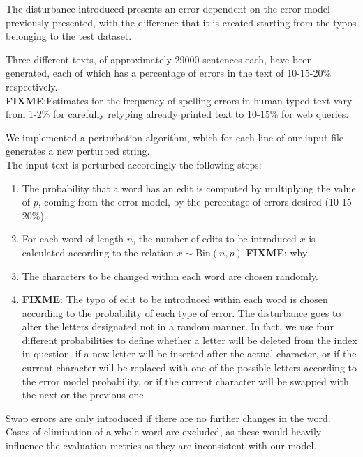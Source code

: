 The disturbance introduced presents an error dependent on the error model previously presented, with the 
difference that it is created starting from the typos belonging to the test dataset.

Three different texts, of approximately \num{29000} sentences each, have been generated, each of which has a 
percentage of errors in the text of \num{10}-\num{15}-\num{20}\% respectively. \\

\textbf{FIXME}:Estimates for the frequency of spelling errors in human-typed text vary from 1-2\% for carefully retyping 
already printed 
text to 10-15\% for web queries.

We implemented a perturbation algorithm, which for each line of our input file generates a new perturbed string.\\
The input text is perturbed accordingly the following steps:

\begin{enumerate}
	\item The probability that a word has an edit is computed by multiplying the value of $p$, coming from the error model, 
	by the percentage of errors desired (10-15-20\%).
	\item For each word of length $n$, the number of edits to be introduced $x$ is calculated according to the relation $x 
	\sim \text{Bin}(n, p)$ \textbf{FIXME}: why
	\item The characters to be changed within each word are chosen randomly.
	\item \textbf{FIXME}:  The typo of edit to be introduced within each word is chosen according to the probability of each 
	type of error.
	The disturbance goes to alter the letters designated not in a random manner. 
	In fact, we use four different probabilities to define whether a letter will be deleted from the index in question, if a new 
	letter will be inserted after the actual character, or if the current character will be replaced with one of the possible 
	letters according to the error model probability, or if the current character will be swapped with the next or the previous 
	one.
	
\end{enumerate}

Swap errors are only introduced if there are no further changes in the word. Cases of elimination of a whole word are 
excluded, as these would heavily influence the evaluation metrics as they are 
inconsistent with our model. 



